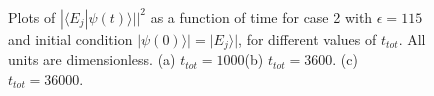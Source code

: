 \begin{figure} 
\ 
\caption{Plots of $|{\langle}E_j|{\psi}(t){\rangle|}|^2$ as a function of time for case 2 with $\epsilon=115$  and initial condition $|{\psi}(0){\rangle|}=|E_j{\rangle|}$, for different values of  $t_{tot}$. All units are dimensionless. (a) $t_{tot}=1000$(b) $t_{tot}=3600$. (c) $t_{tot}=36000$.}
\label{fig:e_115timeev_case02}
\end{figure}
